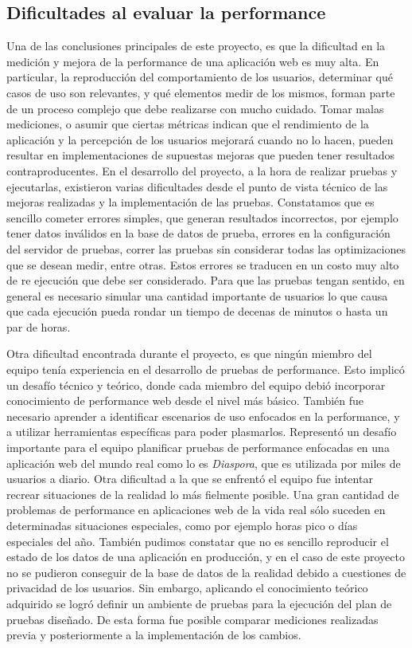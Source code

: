 \subsection{Dificultades al evaluar la performance}

Una de las conclusiones principales de este proyecto, es que la dificultad en la medición y mejora de la performance de una aplicación web es muy alta. En particular, la reproducción del
comportamiento de los usuarios, determinar qué casos de uso son relevantes, y qué elementos medir de los mismos, forman parte de un proceso complejo que debe realizarse con mucho cuidado. Tomar malas mediciones, o asumir que ciertas métricas indican que el rendimiento de la aplicación y la percepción de los usuarios mejorará cuando no lo hacen, pueden resultar
en implementaciones de supuestas mejoras que pueden tener resultados contraproducentes. En el desarrollo del proyecto, a la hora de realizar pruebas y ejecutarlas, existieron
varias dificultades desde el punto de vista técnico de las mejoras realizadas y la implementación de las pruebas. Constatamos que es sencillo cometer errores simples, que 
generan resultados incorrectos, por ejemplo tener datos inválidos en la base de datos de prueba, errores en la configuración del servidor de pruebas, correr las pruebas sin considerar todas las 
optimizaciones que se desean medir, entre otras. Estos errores se traducen en un costo muy alto de re ejecución que debe ser considerado. Para que las pruebas tengan sentido, en general es necesario simular una cantidad importante de usuarios lo que causa que cada ejecución pueda rondar un tiempo de decenas de minutos o hasta un par de horas.

Otra dificultad encontrada durante el proyecto, es que ningún miembro del equipo tenía experiencia en el desarrollo de pruebas de performance. Esto implicó un desafío técnico y teórico,
donde cada miembro del equipo debió incorporar conocimiento de performance web desde el nivel más básico. También fue necesario aprender a identificar escenarios de uso
enfocados en la performance, y a utilizar herramientas específicas para poder plasmarlos. 
Representó un desafío importante para el equipo planificar pruebas de performance enfocadas en una aplicación web del mundo real como lo es \emph{Diaspora},
que es utilizada por miles de usuarios a diario.
Otra dificultad a la que se enfrentó el equipo fue intentar recrear situaciones de la realidad lo más fielmente posible. Una gran cantidad de problemas de performance en aplicaciones web
de la vida real sólo suceden en determinadas situaciones especiales, como por ejemplo horas pico o días especiales del año. 
También pudimos constatar que no es sencillo reproducir el estado de los datos de una aplicación en producción, y en el caso de este proyecto no se pudieron conseguir de la base de datos
de la realidad debido a cuestiones de privacidad de los usuarios.
Sin embargo, aplicando el conocimiento teórico adquirido se logró definir un ambiente de pruebas para la ejecución del plan de pruebas diseñado. 
De esta forma fue posible comparar mediciones realizadas previa y posteriormente a la implementación de los cambios.


